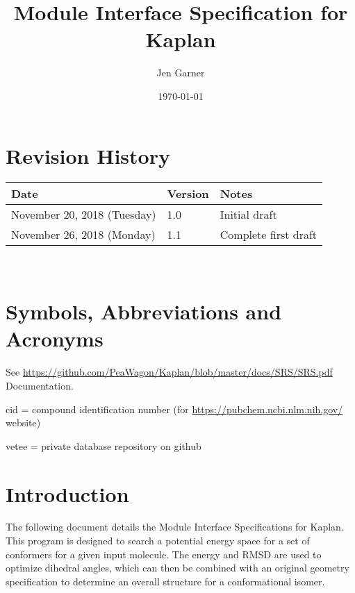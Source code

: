 \documentclass[12pt, titlepage]{article}
\newcommand{\progname}{Kaplan}
\begin{document}
\title{Module Interface Specification for \progname{}}

\author{Jen Garner}

\date{\today}

\maketitle


\section{Revision History}

\begin{tabularx}{\textwidth}{p{3cm}p{2cm}X}
\toprule {\bf Date} & {\bf Version} & {\bf Notes}\\
\midrule
November 20, 2018 (Tuesday) & 1.0 & Initial draft \\
November 26, 2018 (Monday) & 1.1 & Complete first draft \\
\bottomrule
\end{tabularx}

~\newpage

\section{Symbols, Abbreviations and Acronyms}

See \href{SRS}{https://github.com/PeaWagon/Kaplan/blob/master/docs/SRS/SRS.pdf} 
Documentation.

cid = compound identification number (for 
\href{pubchem}{https://pubchem.ncbi.nlm.nih.gov/} website)

vetee = private database repository on github

\newpage

\tableofcontents

\newpage


\section{Introduction}

The following document details the Module Interface Specifications for 
\progname{}. This program is designed to search a potential energy space for a 
set of conformers for a given input molecule. The energy and RMSD are used to 
optimize dihedral angles, which can then be combined with an original geometry 
specification to determine an overall structure for a conformational isomer.
\end{document}
